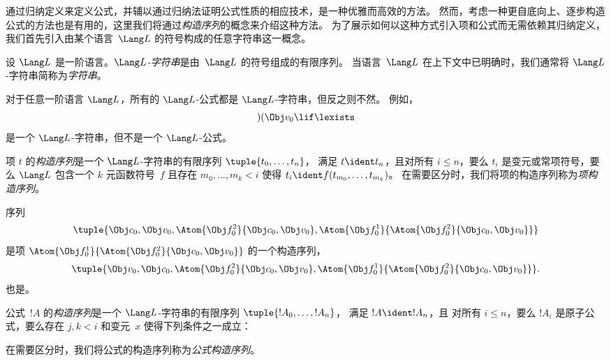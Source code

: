 \documentclass[../../../include/open-logic-section]{subfiles}
\begin{document}


通过归纳定义来定义公式，并辅以通过归纳法证明公式性质的相应技术，是一种优雅而高效的方法。
然而，考虑一种更自底向上、逐步构造公式的方法也是有用的，这里我们将通过\emph{构造序列}的概念来介绍这种方法。
%
为了展示如何以这种方式引入项和公式而无需依赖其归纳定义，我们首先引入由某个语言~$\Lang L$ 的符号构成的任意字符串这一概念。

\begin{defn}[字符串]
设 $\Lang L$ 是一阶语言。\emph{$\Lang L$-字符串}是由~$\Lang L$ 的符号组成的有限序列。
当语言~$\Lang L$ 在上下文中已明确时，我们通常将 $\Lang L$-字符串简称为\emph{字符串}。
\end{defn}

\begin{ex}
对于任意一阶语言 $\Lang L$，所有的
$\Lang L$-公式都是 $\Lang L$-字符串，但反之则不然。
例如，\[)(\Obj v_0\lif\lexists\] 是一个
$\Lang L$-字符串，但不是一个 $\Lang L$-公式。
\end{ex}

\begin{defn}[项的构造序列]
项 $t$ 的\emph{构造序列}是一个 $\Lang L$-字符串的有限序列 $\tuple{t_0,\dotsc,t_n}$，
满足 $t \ident t_n$，且对所有
$i \leq n$，要么 $t_i$ 是变元或常项符号，要么 $\Lang
L$ 包含一个 $k$ 元函数符号~$f$ 且存在
$m_0,\dotsc,m_k < i$ 使得 $t_i \ident f(t_{m_0},\dotsc,t_{m_k})$。
在需要区分时，我们将项的构造序列称为\emph{项构造序列}。
\end{defn}

\begin{ex}
序列
\[
    \tuple{\Obj c_0, \Obj v_0, \Atom{\Obj f^2_0}{\Obj c_0, \Obj v_0}, \Atom{\Obj f^1_0}{\Atom{\Obj f^2_0}{\Obj c_0, \Obj v_0}}}
\]
是项 $\Atom{\Obj f^1_0}{\Atom{\Obj
f^2_0}{\Obj c_0, \Obj v_0}}$ 的一个构造序列，
\[
    \tuple{\Obj v_0, \Obj c_0, \Atom{\Obj f^2_0}{\Obj c_0, \Obj v_0}, \Atom{\Obj f^1_0}{\Atom{\Obj f^2_0}{\Obj c_0, \Obj v_0}}}.
\]
也是。
\end{ex}

\begin{defn}[公式的构造序列]
公式~$!A$ 的\emph{构造序列}是一个 $\Lang L$-字符串的有限序列 $\tuple{!A_0,\dotsc,!A_n}$，
满足 $!A \ident !A_n$，且
对所有 $i \leq n$，要么 $!A_i$ 是原子公式，要么存在
$j,k < i$ 和变元~$x$ 使得下列条件之一成立：
\begin{enumerate}
\end{enumerate}
在需要区分时，我们将公式的构造序列称为\emph{公式构造序列}。
\end{defn}
\end{document}
